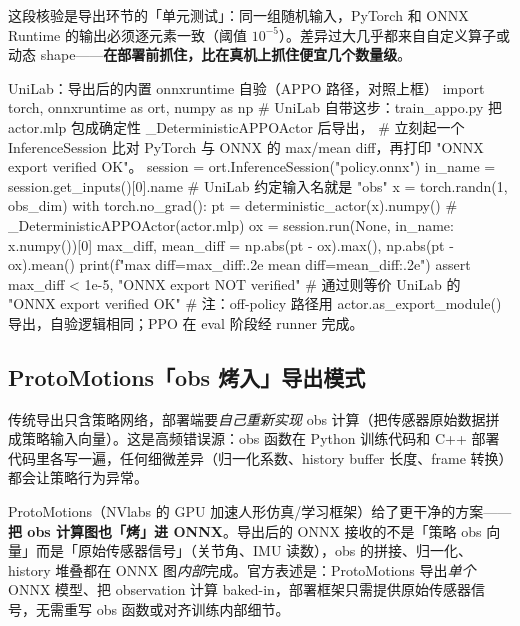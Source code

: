 这段核验是导出环节的「单元测试」：同一组随机输入，PyTorch 和 ONNX Runtime 的输出必须逐元素一致（阈值 $10^{-5}$）。差异过大几乎都来自自定义算子或动态 shape——\textbf{在部署前抓住，比在真机上抓住便宜几个数量级}。

\begin{codebox}[Python]{UniLab：导出后的内置 onnxruntime 自验（APPO 路径，对照上框）}
import torch, onnxruntime as ort, numpy as np
# UniLab 自带这步：train_appo.py 把 actor.mlp 包成确定性 _DeterministicAPPOActor 后导出，
# 立刻起一个 InferenceSession 比对 PyTorch 与 ONNX 的 max/mean diff，再打印 "ONNX export verified OK"。
session = ort.InferenceSession("policy.onnx")
in_name = session.get_inputs()[0].name             # UniLab 约定输入名就是 "obs"
x = torch.randn(1, obs_dim)
with torch.no_grad():
    pt = deterministic_actor(x).numpy()            # _DeterministicAPPOActor(actor.mlp)
ox = session.run(None, {in_name: x.numpy()})[0]
max_diff, mean_diff = np.abs(pt - ox).max(), np.abs(pt - ox).mean()
print(f"max diff={max_diff:.2e}  mean diff={mean_diff:.2e}")
assert max_diff < 1e-5, "ONNX export NOT verified"  # 通过则等价 UniLab 的 "ONNX export verified OK"
# 注：off-policy 路径用 actor.as_export_module() 导出，自验逻辑相同；PPO 在 eval 阶段经 runner 完成。
\end{codebox}

\subsection{ProtoMotions「obs 烤入」导出模式}
\label{sec:rlmc-s2r-baked}

传统导出只含策略网络，部署端要\emph{自己重新实现} obs 计算（把传感器原始数据拼成策略输入向量）。这是高频错误源：obs 函数在 Python 训练代码和 C++ 部署代码里各写一遍，任何细微差异（归一化系数、history buffer 长度、frame 转换）都会让策略行为异常。

ProtoMotions（NVlabs 的 GPU 加速人形仿真/学习框架）给了更干净的方案——\textbf{把 obs 计算图也「烤」进 ONNX}\cite{nvlabs_protomotions}。导出后的 ONNX 接收的不是「策略 obs 向量」而是「原始传感器信号」（关节角、IMU 读数），obs 的拼接、归一化、history 堆叠都在 ONNX 图\emph{内部}完成。官方表述是：ProtoMotions 导出\emph{单个} ONNX 模型、把 observation 计算 baked-in，部署框架只需提供原始传感器信号，无需重写 obs 函数或对齐训练内部细节。

